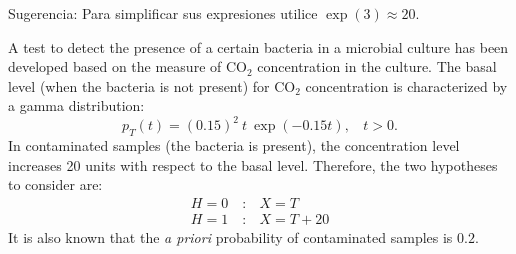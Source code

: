 Sugerencia: Para simplificar sus expresiones utilice $\exp(3) \approx 20$.
\begin{solution}
\end{solution}


\else


A test to detect the presence of a certain bacteria in a microbial culture has been developed based on the measure of $\text{CO}_2$ concentration in the culture. The basal level (when the bacteria is not present) for $\text{CO}_2$ concentration is characterized by a gamma distribution:
$$ p_T(t) = (0.15)^2 ~  t ~  \exp(-0.15 t), ~~~~t > 0.$$
In contaminated samples (the bacteria is present), the concentration level increases 20 units with respect to the basal level. Therefore, the two hypotheses to consider are:
\begin{equation}
\begin{array}{ll}
H=0\quad: & X = T \\
H=1\quad: & X = T + 20
\end{array}
\end{equation}
It is also known that the {\em a priori} probability of contaminated samples is $0.2$.

